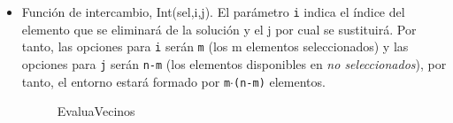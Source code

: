 \begin{itemize}
	
	
	
	\item Función de intercambio, Int(sel,i,j). El parámetro \texttt{i} indica el índice del elemento que se eliminará de la solución y el j por cual se sustituirá. Por tanto, las opciones para \texttt{i} serán \texttt{m} (los m elementos seleccionados) y las opciones para \texttt{j} serán \texttt{n-m} (los elementos disponibles en \textit{no seleccionados}), por tanto, el entorno estará formado por \texttt{m$\cdot$(n-m)} elementos.
	
	
	
	\begin{figure}[H]
		\centering
		\begin{minipage}{.75\linewidth}
			
			\begin{algorithm}[H] 
				\caption{EvaluaVecinos }
				\SetAlgoLined
				
				
				
			\end{algorithm}
		\end{minipage}
	\end{figure}
	

\end{itemize}
